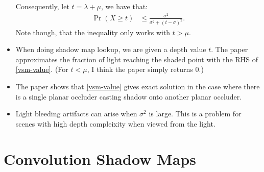 \documentclass[10pt]{article}
\begin{document}
\begin{itemize}
  	Consequently, let $t = \lambda + \mu$, we have that:
  	\begin{align}
  		\Pr(X \geq t) &\leq \frac{\sigma^2}{\sigma^2 + (t - \sigma)^2}. \label{vsm-value}
  	\end{align}
  	Note though, that the inequality only works with $t > \mu$.

  	\item When doing shadow map lookup, we are given a depth value $t$.  The paper approximates the fraction of light reaching the shaded point with the RHS of \eqref{vsm-value}.  (For $t < \mu$, I think the paper simply returns $0$.)

  	\item The paper shows that \eqref{vsm-value} gives exact solution in the case where there is a single planar occluder casting shadow onto another planar occluder.

  	\item Light bleeding artifacts can arise when $\sigma^2$ is large.  This is a problem for scenes with high depth compleixity when viewed from the light.
  \end{itemize}

  \section{Convolution Shadow Maps}
\end{document}

